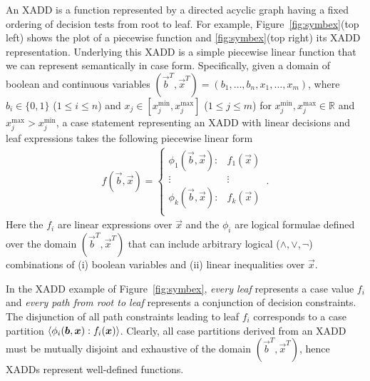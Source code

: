 

An XADD is a function represented by a directed acyclic graph having a
fixed ordering of decision tests from root to leaf.  For example,
Figure~\ref{fig:symbex}(top left) shows the plot of a piecewise function and
\ref{fig:symbex}(top right) its XADD representation.  Underlying this
XADD is a simple piecewise linear
function that we can represent semantically in case form.
Specifically, given a domain of boolean and continuous variables
$(\vec{b}^T,\vec{x}^T) = ( b_1,\ldots,b_n,x_{1},\ldots,x_m )$, where
$b_i \in \{ 0,1 \}$ ($1 \leq i \leq n$) and $x_j \in
[x_j^{\min},x_j^{\max}]$ ($1 \leq j \leq m$) for
$x_j^{\min},x_j^{\max} \in \mathbb{R}$ and $x_j^{\max} > x_j^{\min}$,
a case statement representing an XADD with linear decisions and leaf
expressions takes the following piecewise linear form {\footnotesize
\begin{align}
f(\vec{b},\vec{x}) = 
\begin{cases}
  \phi_1(\vec{b},\vec{x}): & f_1(\vec{x}) \\ 
 \vdots&\vdots\\ 
  \phi_k(\vec{b},\vec{x}): & f_k(\vec{x}) \\ 
\end{cases} \, . \label{eq:case}
\end{align}
} 
Here the $f_i$ are linear expressions over $\vec{x}$ and the $\phi_i$
are logical formulae defined over the domain $(\vec{b}^T,\vec{x}^T)$ that
can include arbitrary logical ($\land,\lor,\neg$) combinations of (i)
boolean variables and (ii) linear inequalities over $\vec{x}$.

In the XADD example of Figure~\ref{fig:symbex},  
\emph{every leaf} represents a case value $f_i$ and 
\emph{every path from root to leaf} represents a conjunction
of decision constraints.  The disjunction of all path constraints
leading to leaf $f_i$ corresponds to a case partition
$\langle \phi_i(\boldsymbol{b},\boldsymbol{x}) : f_i(\boldsymbol{x}) \rangle$.  Clearly, all case
partitions derived from an XADD must be mutually disjoint and
exhaustive of the domain $(\vec{b}^T,\vec{x}^T)$, hence XADDs
represent well-defined functions.

